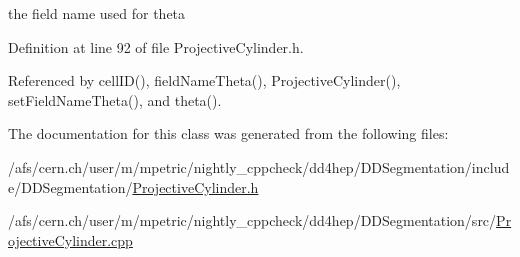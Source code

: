 the field name used for theta 



Definition at line 92 of file Projective\+Cylinder.\+h.



Referenced by cell\+I\+D(), field\+Name\+Theta(), Projective\+Cylinder(), set\+Field\+Name\+Theta(), and theta().



The documentation for this class was generated from the following files\+:\begin{DoxyCompactItemize}
\item 
/afs/cern.\+ch/user/m/mpetric/nightly\+\_\+cppcheck/dd4hep/\+D\+D\+Segmentation/include/\+D\+D\+Segmentation/\hyperlink{_projective_cylinder_8h}{Projective\+Cylinder.\+h}\item 
/afs/cern.\+ch/user/m/mpetric/nightly\+\_\+cppcheck/dd4hep/\+D\+D\+Segmentation/src/\hyperlink{_projective_cylinder_8cpp}{Projective\+Cylinder.\+cpp}\end{DoxyCompactItemize}
